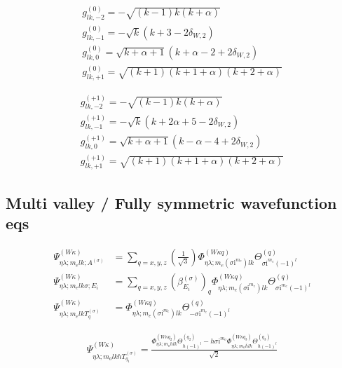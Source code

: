 \begin{gather*}
    g_{lk,-2}^{(0)}
    =
    -\sqrt{(k-1)k(k+\alpha)}
    \\
    g_{lk,-1}^{(0)}
    =
    -\sqrt{k}\left(k+3-2\delta_{W,2}\right)
    \\
    g_{lk,0}^{(0)}
    =
    \sqrt{k+\alpha+1}
    \left(k+\alpha-2+2\delta_{W,2}\right)
    \\
    g_{lk,+1}^{(0)}
    =
    \sqrt{(k+1)(k+1+\alpha)(k+2+\alpha)}
\end{gather*}

\begin{gather*}
    g_{lk,-2}^{(+1)}
    =
    -\sqrt{(k-1)k(k+\alpha)}
    \\
    g_{lk,-1}^{(+1)}
    =
    -\sqrt{k}\left(k+2\alpha+5-2\delta_{W,2}\right)
    \\
    g_{lk,0}^{(+1)}
    =
    \sqrt{k+\alpha+1}
    \left(k-\alpha-4+2\delta_{W,2}\right)
    \\
    g_{lk,+1}^{(+1)}
    =
    \sqrt{(k+1)(k+1+\alpha)(k+2+\alpha)}
\end{gather*}

\pagebreak
\subsection{Multi valley / Fully symmetric wavefunction eqs}

\begin{align*}
    \Psi_{\eta\lambda;m_{e}lk;A^{\left(\sigma\right)}}^{\left(W\kappa\right)}
    & =
    \sum_{q = x,y,z} 
    \left(\frac{1}{\sqrt{3}}\right)
    \Phi_{\eta\lambda;m_{e}(\sigma\mathrm{i}^{m_{e}})lk}^{(W\kappa q)}
    \Theta^{(q)}_{\sigma\mathrm{i}^{m_{e}}(-1)^{l}}
    \\
    \Psi_{\eta\lambda;m_{e}lk\sigma;E_{i}}^{\left(W\kappa\right)}
    & =
    \sum_{q = x,y,z}
    \left(\beta_{E_{i}}^{(\sigma)}\right)_{q}
    \Phi_{\eta\lambda;m_{e}(\sigma\mathrm{i}^{m_{e}})lk}^{(W\kappa q)}
    \Theta^{(q)}_{\sigma\mathrm{i}^{m_{e}}(-1)^{l}}
    \\
    \Psi_{\eta\lambda;m_{e}lkT_{q}^{(\sigma)}}^{\left(W\kappa\right)}
    & =
    \Phi_{\eta\lambda;m_{e}(\sigma\mathrm{i}^{m_{e}})lk}^{(W\kappa q)}
    \Theta_{-\sigma\mathrm{i}^{m_{e}}(-1)^{l}}^{(q)}
\end{align*}

\begin{align*}
    \Psi_{\eta\lambda;m_{o}lkhT_{q_{1}}^{(\sigma)}}^{\left(W\kappa\right)}
    =
    \frac
    {
    \Phi_{\eta\lambda;m_{o}hlk}^{\left(W\kappa q_{2}\right)}\Theta_{h(-1)^{l}}^{(q_{2})}
    - h\sigma\mathrm{i}^{m_{o}}\Phi_{\eta\lambda;m_{o}\bar{h}lk}^{\left(W\kappa q_{3}\right)}\Theta_{h(-1)^{l}}^{(q_{3})}
    }
    {\sqrt{2}}
\end{align*}

